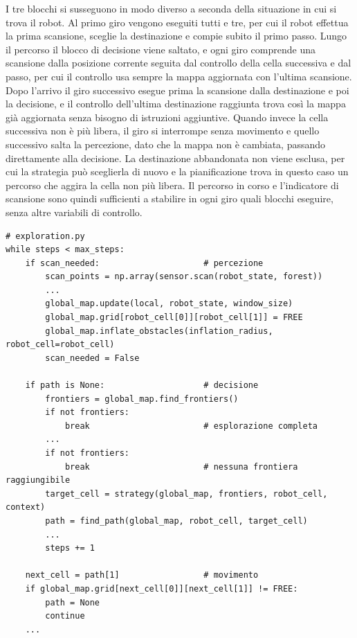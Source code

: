 I tre blocchi si susseguono in modo diverso a seconda della situazione in cui si trova il robot. Al primo giro vengono eseguiti tutti e tre, per cui il robot effettua la prima scansione, sceglie la destinazione e compie subito il primo passo. Lungo il percorso il blocco di decisione viene saltato, e ogni giro comprende una scansione dalla posizione corrente seguita dal controllo della cella successiva e dal passo, per cui il controllo usa sempre la mappa aggiornata con l'ultima scansione. Dopo l'arrivo il giro successivo esegue prima la scansione dalla destinazione e poi la decisione, e il controllo dell'ultima destinazione raggiunta trova così la mappa già aggiornata senza bisogno di istruzioni aggiuntive. Quando invece la cella successiva non è più libera, il giro si interrompe senza movimento e quello successivo salta la percezione, dato che la mappa non è cambiata, passando direttamente alla decisione. La destinazione abbandonata non viene esclusa, per cui la strategia può sceglierla di nuovo e la pianificazione trova in questo caso un percorso che aggira la cella non più libera. Il percorso in corso e l'indicatore di scansione sono quindi sufficienti a stabilire in ogni giro quali blocchi eseguire, senza altre variabili di controllo.

\begin{lstlisting}[float=!htb, label=lst:ciclo, caption={Struttura del ciclo di esplorazione nella funzione \texttt{run\_exploration}, in forma ridotta.}]
# exploration.py
while steps < max_steps:
    if scan_needed:                     # percezione
        scan_points = np.array(sensor.scan(robot_state, forest))
        ...
        global_map.update(local, robot_state, window_size)
        global_map.grid[robot_cell[0]][robot_cell[1]] = FREE
        global_map.inflate_obstacles(inflation_radius, robot_cell=robot_cell)
        scan_needed = False

    if path is None:                    # decisione
        frontiers = global_map.find_frontiers()
        if not frontiers:
            break                       # esplorazione completa
        ...
        if not frontiers:
            break                       # nessuna frontiera raggiungibile
        target_cell = strategy(global_map, frontiers, robot_cell, context)
        path = find_path(global_map, robot_cell, target_cell)
        ...
        steps += 1

    next_cell = path[1]                 # movimento
    if global_map.grid[next_cell[0]][next_cell[1]] != FREE:
        path = None
        continue
    ...
\end{lstlisting}

